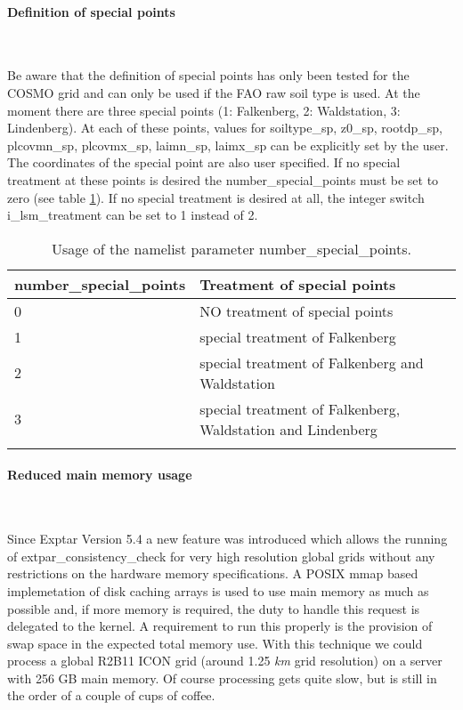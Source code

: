 \documentclass[a4paper,10pt,DIV14,BCOR1cm,titlepage,twoside]{scrartcl}
\providecommand{\tabularnewline}{\\}
\begin{document}
\paragraph{Definition of special points}\ \par\medskip\noindent
Be aware that the definition of special points has only been tested for the COSMO grid and can only be used if the FAO raw soil type is used. At the moment there are three special points (1: Falkenberg, 2: Waldstation, 3: Lindenberg). At each of these points, values for soiltype\_sp, z0\_sp, rootdp\_sp, plcovmn\_sp, plcovmx\_sp, laimn\_sp, laimx\_sp can be explicitly set by the user. The coordinates of the special point are also user specified. If no special treatment at these points is desired the number\_special\_points must be set to zero (see table \ref{tab:number_special_points}). If no special treatment is desired at all, the integer switch i\_lsm\_treatment can be set to 1 instead of 2. \par\medskip\noindent
\begin{longtable}{p{4.25cm}|p{10.25cm}}
\textbf{number\_special\_points} & \textbf{Treatment of special points}  \tabularnewline
\hline
\endhead
\hline
0 & NO treatment of special points \tabularnewline
1 & special treatment of Falkenberg \tabularnewline
2 & special treatment of Falkenberg and Waldstation \tabularnewline
3 & special treatment of Falkenberg, Waldstation and Lindenberg \tabularnewline
\bottomrule
\caption{Usage of the namelist parameter number\_special\_points.}
\label{tab:number_special_points}
\end{longtable}

\paragraph{Reduced main memory usage}\ \par\medskip\noindent

\noindent Since Exptar Version 5.4 a new feature was introduced 
which allows the running of extpar\_consistency\_check for very 
high resolution global grids without any restrictions on the hardware memory specifications.
A POSIX mmap based implemetation of disk caching arrays is
used to use main memory as much as possible and, if more memory
is required, the duty to handle this request is delegated to the
kernel. A requirement to run this properly is the provision of
swap space in the expected total memory use. With this technique
we could process a global R2B11 ICON grid (around 1.25 \textit{km} grid
resolution) on a server with 256 GB main memory. Of course
processing gets quite slow, but is still in the order of a couple
of cups of coffee. 
\end{document}

